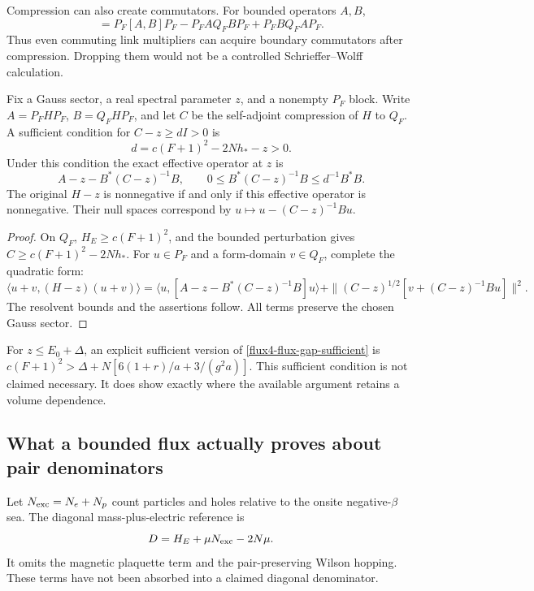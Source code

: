 Compression can also create commutators.  For bounded operators $A,B$,
\begin{equation}
 [P_FAP_F,P_FBP_F]
 =P_F[A,B]P_F-P_FAQ_FBP_F+P_FBQ_FAP_F.
 \label{flux4-compressed-commutator}
\end{equation}
Thus even commuting link multipliers can acquire boundary
commutators after compression.  Dropping them would not be a
controlled Schrieffer--Wolff calculation.

\begin{lemma}
\label{flux4-schur}
Fix a Gauss sector, a real spectral parameter $z$, and a nonempty
$P_F$ block.  Write $A=P_FHP_F$, $B=Q_FHP_F$, and let $C$ be
the self-adjoint compression of $H$ to $Q_F$.  A sufficient condition
for $C-z\ge dI>0$ is
\begin{equation}
 d=c(F+1)^2-2Nh_*-z>0.
 \label{flux4-flux-gap-sufficient}
\end{equation}
Under this condition the exact effective operator at $z$ is
\begin{equation}
 A-z-B^*(C-z)^{-1}B,
 \qquad
 0\le B^*(C-z)^{-1}B\le d^{-1}B^*B.
 \label{flux4-flux-schur}
\end{equation}
The original $H-z$ is nonnegative if and only if this effective
operator is nonnegative.  Their null spaces correspond by
$u\mapsto u-(C-z)^{-1}Bu$.
\end{lemma}
\begin{proof}
On $Q_F$, $H_E\ge c(F+1)^2$, and the bounded perturbation gives
$C\ge c(F+1)^2-2Nh_*$.  For $u\in P_F$ and a form-domain
$v\in Q_F$, complete the quadratic form:
\[
 \langle u+v,(H-z)(u+v)\rangle
 =\langle u,[A-z-B^*(C-z)^{-1}B]u\rangle
 +\|(C-z)^{1/2}[v+(C-z)^{-1}Bu]\|^2.
\]
The resolvent bounds and the assertions follow.  All terms preserve
the chosen Gauss sector.
\end{proof}

For $z\le E_0+\Delta$, an explicit sufficient version of
\eqref{flux4-flux-gap-sufficient} is
$c(F+1)^2>\Delta+N[6(1+r)/a+3/(g^2a)]$.
This sufficient condition is not claimed necessary.  It does show
exactly where the available argument retains a volume dependence.

\subsection{What a bounded flux actually proves about pair denominators}

Let $N_{\rm exc}=N_e+N_p$ count particles and holes relative to the
onsite negative-$\beta$ sea.  The diagonal mass-plus-electric
reference is
\begin{equation}
 D=H_E+\mu N_{\rm exc}-2N\mu.
 \label{flux4-diagonal-reference}
\end{equation}
It omits the magnetic plaquette term and the pair-preserving Wilson
hopping.  These terms have not been absorbed into a claimed
diagonal denominator.

